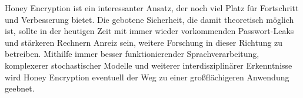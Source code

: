 Honey Encryption ist ein interessanter Ansatz, der noch viel Platz für Fortschritt und Verbesserung bietet. Die gebotene Sicherheit, die damit theoretisch möglich ist, sollte in der heutigen Zeit mit immer wieder vorkommenden Passwort-Leaks und stärkeren Rechnern Anreiz sein, weitere Forschung in dieser Richtung zu betreiben. Mithilfe immer besser funktionierender Sprachverarbeitung, komplexerer stochastischer Modelle und weiterer interdisziplinärer Erkenntnisse wird Honey Encryption eventuell der Weg zu einer großflächigeren Anwendung geebnet.